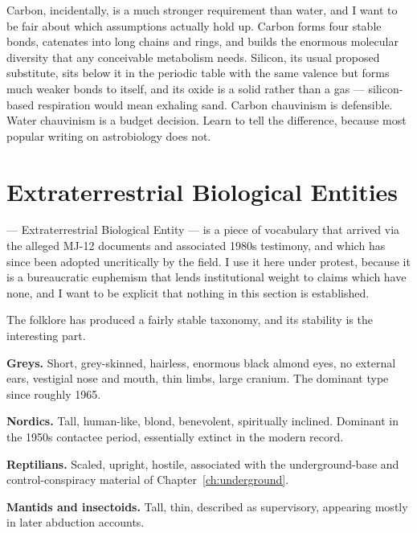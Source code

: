 Carbon, incidentally, is a much stronger requirement than water, and I want to be fair about
which assumptions actually hold up. Carbon forms four stable bonds, catenates into long
chains and rings, and builds the enormous molecular diversity that any conceivable metabolism
needs. Silicon, its usual proposed substitute, sits below it in the periodic table with the
same valence but forms much weaker bonds to itself, and its oxide is a solid rather than a
gas --- silicon-based respiration would mean exhaling sand. Carbon chauvinism is defensible.
Water chauvinism is a budget decision. Learn to tell the difference, because most popular
writing on astrobiology does not.

\section{Extraterrestrial Biological Entities}\label{sec:extraterrestrialbiologic}

 --- Extraterrestrial Biological Entity --- is a piece of vocabulary that arrived
via the alleged MJ-12 documents and associated 1980s testimony, and which has since been
adopted uncritically by the field. I use it here under protest, because it is a bureaucratic
euphemism that lends institutional weight to claims which have none, and I want to be explicit
that nothing in this section is established.

The folklore has produced a fairly stable taxonomy, and its stability is the interesting part.

\textbf{Greys.} Short, grey-skinned, hairless, enormous black almond eyes, no external ears,
vestigial nose and mouth, thin limbs, large cranium. The dominant type since roughly 1965.

\textbf{Nordics.} Tall, human-like, blond, benevolent, spiritually inclined. Dominant in the
1950s contactee period, essentially extinct in the modern record.

\textbf{Reptilians.} Scaled, upright, hostile, associated with the underground-base and
control-conspiracy material of Chapter~\ref{ch:underground}.

\textbf{Mantids and insectoids.} Tall, thin, described as supervisory, appearing mostly in
later abduction accounts.

